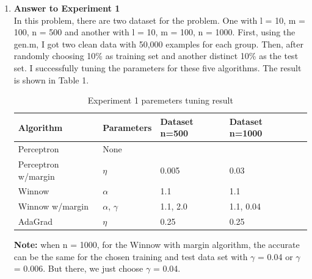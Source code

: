 

\usepackage{graphicx,amssymb,amsmath, listings}
\lstset{language = Matlab}
\lstset{breaklines}
\usepackage{float}
\lstset{extendedchars=false}

\oddsidemargin 0in
\evensidemargin 0in
\textwidth 6.5in
\topmargin -0.5in
\textheight 9.0in



\pagestyle{myheadings}  %

\begin{enumerate}
\item {\bf Answer to Experiment 1}\\

In this problem, there are two dataset for the problem. One with l = 10, m = 100, n = 500 and another with l = 10, m = 100, n = 1000. First, using the gen.m, I got two clean data with 50,000 examples for each group. Then, after randomly choosing 10\% as training set and another distinct 10\% as the test set. I successfully tuning the parameters for these five algorithms. The result is shown in Table 1.\\

\begin{table}[H]
\caption {Experiment 1 paremeters tuning result} \label{tab:title} 
  \begin{center}
    \begin{tabular}{|p{3.0cm}|p{2.2cm}|p{2.5cm}|p{2.5cm}|p{2.5cm}|}
      \hline
      Algorithm & Parameters & Dataset n=500 & Dataset n=1000\\\hline\hline
      Perceptron & None &  &  \\\hline
      Perceptron w/margin & $\eta$ & 0.005 & 0.03 \\\hline
      Winnow & $\alpha$& 1.1 &  1.1    \\\hline
      Winnow w/margin & $\alpha$, $\gamma$ & 1.1, 2.0 &  1.1, 0.04 \\\hline
      AdaGrad & $\eta$ & 0.25 &  0.25 \\\hline
    \end{tabular}
  \end{center}
\end{table}

  
{\bf Note:} when n = 1000, for the Winnow with margin algorithm, the accurate can be the same for the chosen training and test data set with $\gamma$ = 0.04 or $\gamma$ = 0.006. But there, we just choose $\gamma$ = 0.04.\\


\end{enumerate}
